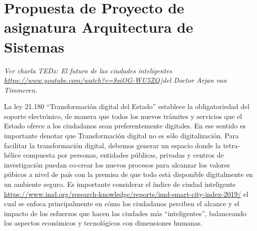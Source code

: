 \chapter{Propuesta de Proyecto de asignatura Arquitectura de Sistemas}
\vspace{80px}
\begin{flushright}
\textit{Ver charla TEDx: El futuro de las ciudades inteligentes \url{https://www.youtube.com/watch?v=8siOG-WU5ZQ})del Doctor Arjan van Timmeren}.
\end{flushright}


La ley 21.180 ``Transformación digital del Estado'' establece la obligatoriedad del soporte electrónico, de manera que todos los nuevos trámites y servicios que el Estado ofrece a los ciudadanos sean preferentemente digitales. En ese sentido es importante denotar que Transformación digital no es sólo digitalización. Para facilitar la transformación digital, debemos generar un espacio donde la tetra-hélice compuesta por personas, entidades públicas, privadas y centros de investigación puedan co-crear los nuevos procesos para alcanzar los valores púbicos  a nivel de  país con la premisa de que todo está disponible digitalmente en un ambiente seguro. 
%
Es importante considerar el índice de ciudad inteligente \url{https://www.imd.org/research-knowledge/reports/imd-smart-city-index-2019/} el cual se enfoca principalmente en cómo los ciudadanos perciben el alcance y el impacto de los esfuerzos que hacen las ciudades más ``inteligentes'', balanceando los aspectos económicos y tecnológicos con dimensiones humanas. 


